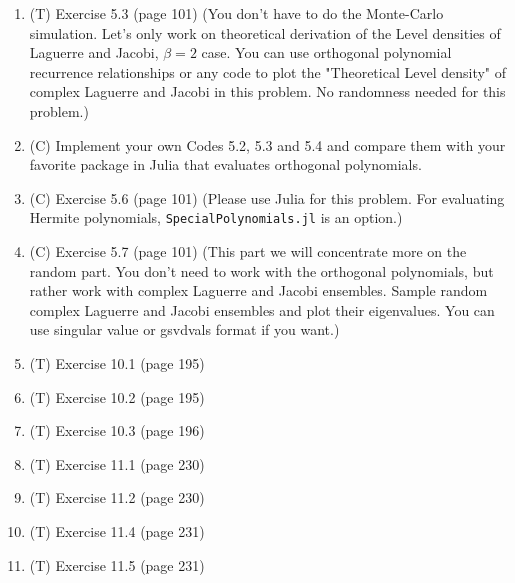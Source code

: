 \documentclass{article}
\begin{document}
\begin{enumerate}
    \item (T) Exercise 5.3 (page 101) (You don't have to do the Monte-Carlo simulation. Let's only work on theoretical derivation of the Level densities of Laguerre and Jacobi, $\beta=2$ case. You can use orthogonal polynomial recurrence relationships or any code to plot the "Theoretical Level density" of complex Laguerre and Jacobi in this problem. No randomness needed for this problem.)
    \item (C) Implement your own Codes 5.2, 5.3 and 5.4 and compare them with your favorite package in Julia that evaluates orthogonal polynomials.  
    \item (C) Exercise 5.6 (page 101) (Please use Julia for this problem. For evaluating Hermite polynomials, \verb|SpecialPolynomials.jl| is an option.)
    \item (C) Exercise 5.7 (page 101) (This part we will concentrate more on the random part. You don't need to work with the orthogonal polynomials, but rather work with complex Laguerre and Jacobi ensembles. Sample random complex Laguerre and Jacobi ensembles and plot their eigenvalues. You can use singular value or gsvdvals format if you want.)
    \item (T) Exercise 10.1 (page 195)
    \item (T) Exercise 10.2 (page 195)
    \item (T) Exercise 10.3 (page 196)
    \item (T) Exercise 11.1 (page 230)
    \item (T) Exercise 11.2 (page 230)
    \item (T) Exercise 11.4 (page 231)
    \item (T) Exercise 11.5 (page 231)
\end{enumerate}
 
\end{document}
